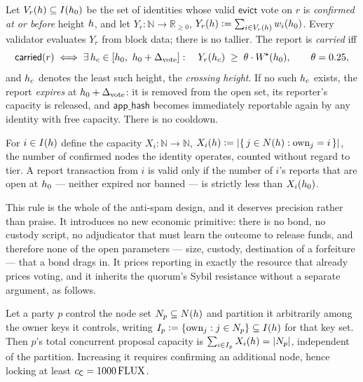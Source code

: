 \begin{definition}
\label{def:23:decision}
Let $V_r(h) \subseteq I(h_0)$ be the set of identities whose valid $\mathsf{evict}$ vote on
$r$ is \emph{confirmed at or before} height $h$, and let
$Y_r : \mathbb{N} \to \mathbb{R}_{\ge 0}$, $Y_r(h) \vcentcolon= \sum_{i \in V_r(h)}
w_{i}(h_0)$. Every validator evaluates $Y_r$ from block data; there is no tallier. The
report is \emph{carried} iff
\[
\mathsf{carried}(r) \iff \exists\, h_c \in [h_0,\ h_0 + \Delta_{\mathrm{vote}}]
:\quad Y_r(h_c) \;\ge\; \theta \cdot W^{\!\star}(h_0),
\qquad \theta = 0.25 ,
\]
and $h_c$ denotes the least such height, the \emph{crossing height}. If no such $h_c$ exists,
the report \emph{expires} at $h_0 + \Delta_{\mathrm{vote}}$: it is removed from the open set, its
reporter's capacity is released, and $\mathsf{app\_hash}$ becomes immediately reportable again by
any identity with free capacity. There is no cooldown.
\end{definition}

\begin{definition}
\label{def:23:capacity}
For $i \in I(h)$ define the capacity $X_i : \mathbb{N} \to \mathbb{N}$,
$X_i(h) \vcentcolon= \lvert\{\,j \in N(h) : \mathrm{own}_j = i\,\}\rvert$, the number of confirmed
nodes the identity operates, counted without regard to tier. A report transaction from $i$ is valid
only if the number of $i$'s reports that are open at $h_0$ --- neither expired nor banned --- is
strictly less than $X_i(h_0)$.
\end{definition}

This rule is the whole of the anti-spam design, and it deserves precision rather than praise.
It introduces no new economic primitive: there is no bond, no custody script, no adjudicator that
must learn the outcome to release funds, and therefore none of the open parameters --- size,
custody, destination of a forfeiture --- that a bond drags in. It prices reporting in exactly the
resource that already prices voting, and it inherits the quorum's Sybil resistance without a
separate argument, as follows.

\begin{proposition}
\label{prop:23:capacity}
Let a party $p$ control the node set $N_p \subseteq N(h)$ and partition it arbitrarily among the
owner keys it controls, writing $I_p \vcentcolon= \{\mathrm{own}_j : j \in N_p\} \subseteq I(h)$ for
that key set. Then $p$'s total concurrent proposal capacity is
$\sum_{i \in I_p} X_i(h) = \lvert N_p \rvert$, independent of the partition. Increasing it
requires confirming an additional node, hence locking at least $c_{\mathsf{C}} = \num{1000}\,\mathrm{FLUX}$.
\end{proposition}

